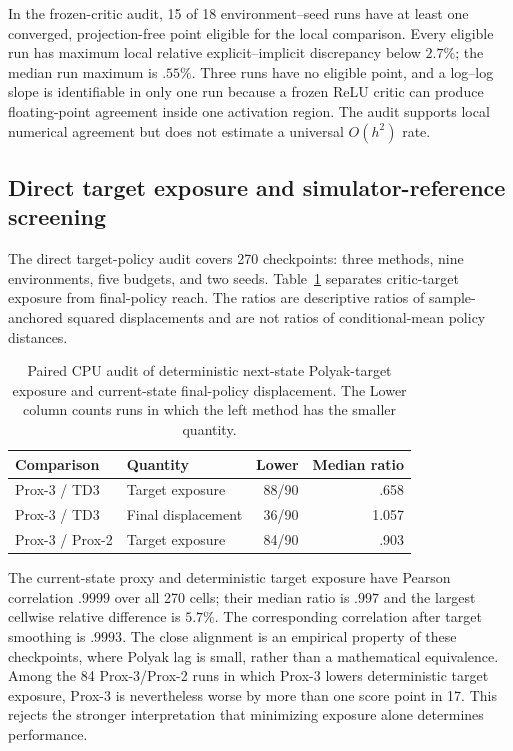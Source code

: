 In the frozen-critic audit, 15 of 18 environment--seed runs have at least one converged, projection-free point eligible for the local comparison. Every eligible run has maximum local relative explicit--implicit discrepancy below $2.7\%$; the median run maximum is $.55\%$. Three runs have no eligible point, and a log--log slope is identifiable in only one run because a frozen ReLU critic can produce floating-point agreement inside one activation region. The audit supports local numerical agreement but does not estimate a universal $O(h^2)$ rate.

\subsection{Direct target exposure and simulator-reference screening}

The direct target-policy audit covers 270 checkpoints: three methods, nine
environments, five budgets, and two seeds. Table~\ref{tab:direct_exposure}
separates critic-target exposure from final-policy reach. The ratios are
descriptive ratios of sample-anchored squared displacements and are not ratios
of conditional-mean policy distances.

\begin{table}[H]
\centering
\caption{Paired CPU audit of deterministic next-state Polyak-target exposure
and current-state final-policy displacement. The Lower column counts runs in
which the left method has the smaller quantity.}
\label{tab:direct_exposure}
\scriptsize
\begin{tabular}{@{}llrr@{}}
\toprule
Comparison & Quantity & Lower & Median ratio\\
\midrule
Prox-3 / TD3 & Target exposure & 88/90 & .658\\
Prox-3 / TD3 & Final displacement & 36/90 & 1.057\\
Prox-3 / Prox-2 & Target exposure & 84/90 & .903\\
\bottomrule
\end{tabular}
\end{table}

The current-state proxy and deterministic target exposure have Pearson
correlation $.9999$ over all 270 cells; their median ratio is $.997$ and the
largest cellwise relative difference is $5.7\%$. The corresponding
correlation after target smoothing is $.9993$. The close alignment is an
empirical property of these checkpoints, where Polyak lag is small, rather
than a mathematical equivalence. Among the 84 Prox-3/Prox-2 runs in which
Prox-3 lowers deterministic target exposure, Prox-3 is nevertheless worse by
more than one score point in 17. This rejects the stronger interpretation
that minimizing exposure alone determines performance.

